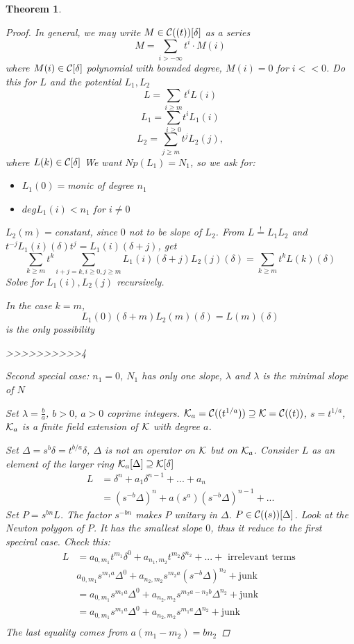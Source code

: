 \documentclass[11pt]{article}
\newtheorem{thm}{Theorem}[section]
\newcommand{\calc}{{\cal C}}
\newcommand{\calk}{{\cal K}}
\begin{document}
\begin{thm}
\begin{proof}
In general, we may write $M\in \calc((t))[\delta]$ as a series
$$
M=\sum_{i>-\infty}t^i\cdot M(i)
$$
where $M(i)\in \calc[\delta]$ polynomial with bounded degree, $M(i)=0$ for $i<<0$.
Do this for $L$ and the potential $L_1, L_2$
$$
L=\sum_{i\geq m}t^i L(i)
$$
$$
L_1=\sum_{i\geq 0}t^i L_1(i)
$$
$$
L_2=\sum_{j\geq m}t^j L_2(j),
$$
where $L(k)\in\calc[\delta]$
We want $Np(L_1)=N_1$, so we ask for: 
\begin{itemize}
\item $L_1(0)=$monic of degree $n_1$
\item $deg L_1(i)<n_1$ for $i\neq 0$
\end{itemize}
$L_2(m)=$constant, since $0$ not to be slope of $L_2$. From $L\overset{!}{=}L_1L_2$ and $t^{-j}L_1(i)(\delta)t^j=L_1(i)(\delta+j)$, get
$$
\sum_{k\geq m}t^{k}\sum_{i+j=k,i \geq 0,j\geq m} L_1(i)(\delta+j)L_2(j)(\delta)=\sum_{k\geq m}t^{k}L(k)(\delta)
$$
Solve for $L_1(i),L_2(j) $ recursively.

In the case $k=m$,
$$
L_1(0)(\delta+m)L_2(m)(\delta)=L(m)(\delta)
$$
is the only possibility



>>>>>>>>>>4


Second special case: $n_1=0$, $N_1$ has only one slope, $\lambda$ and $\lambda$ is the minimal slope of $N$

Set $\lambda=\frac{b}{a}$, $b>0$, $a>0$ coprime integers. $\calk_a=\calc((t^{1/a}))\supseteq \calk=\calc((t))$, $s=t^{1/a}$, $\calk_a$ is a finite field extension of $\calk$ with degree $a$.

Set $\Delta=s^b\delta=t^{b/a}\delta$, $\Delta$ is not an operator on $\calk$ but on $\calk_a$. Consider $L$ as an element of the larger ring $\calk_a[\Delta]\supseteq \calk[\delta]$
$$
\begin{aligned}
L&=\delta^n+a_1\delta^{n-1}+...+a_n\\
&= (s^{-b}\Delta)^n+a(s^a)(s^{-b}\Delta)^{n-1}+...
\end{aligned}
$$
Set $P=s^{bn}L$. The factor $s^{-bn}$ makes $P$ unitary in $\Delta$. $P\in\calc((s))[\Delta]$. Look at the Newton polygon of $P$. It has the smallest slope $0$, thus it reduce to the first speciral case. Check this:
$$
\begin{aligned}
L&=a_{0,m_1}t^{m_1}\delta^0
+a_{n_1,m_2}t^{m_2}\delta^{n_2}+...+\text{ irrelevant terms }\\
& a_{0,m_1} s^{m_1 a}\Delta^0+a_{n_2,m_2}s^{m_2 a}(s^{-b}\Delta)^{n_2}+\text{junk}\\
&=a_{0,m_1} s^{m_1 a}\Delta^0+a_{n_2,m_2}s^{m_2 a-n_2 b}\Delta^{n_2}+\text{junk}\\
&=a_{0,m_1} s^{m_1 a}\Delta^0+a_{n_2,m_2}s^{m_1 a}\Delta^{n_2}+\text{junk}\\
\end{aligned}
$$
The last equality comes from $a(m_1-m_2)=b n_2$


\end{proof}
\end{thm}
\end{document}
